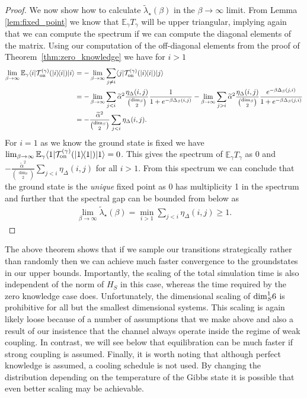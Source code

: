 \documentclass[
 amsmath,amssymb,
 aps,
onecolumn, 
nofootinbib]{revtex4-2}
\newcommand{\on}{\rm on}
\newcommand{\ket}[1]{|#1\rangle}
\newcommand{\bra}[1]{\langle #1|}
\newcommand{\ketbra}[2]{| #1\rangle\! \langle #2|}
\newcommand{\EE}{\mathbb{E}}
\newcommand{\TT}{\mathcal{T}}
\begin{document}
\begin{proof}
We now show how to calculate $\widetilde{\lambda}_\star(\beta)$ in the $\beta \to \infty$ limit. From Lemma \ref{lem:fixed_point} we know that $\EE_\gamma T_\gamma$ will be upper triangular, implying again that we can compute the spectrum if we can compute the diagonal elements of the matrix. Using our computation of the off-diagonal elements from the proof of Theorem~\ref{thm:zero_knowledge} we have for $i > 1$
\begin{align}
    \lim_{\beta \to \infty} \EE_\gamma \bra{i} \TT_{\on}^{(\gamma)}(\ketbra{i}{i}) \ket{i} &= - \lim_{\beta \to \infty} \sum_{j \neq i} \bra{j} \TT_{\on}^{(\gamma)}(\ketbra{i}{i}) \ket{j} \\
    &= - \lim_{\beta \to \infty} \sum_{j < i} \widetilde{\alpha}^2 \frac{\eta_\Delta(i,j)}{\binom{\dim_S}{2}} \frac{1}{1 + e^{-\beta \Delta_S(i,j)}} - \lim_{\beta \to \infty} \sum_{j > i} \widetilde{\alpha}^2 \frac{\eta_\Delta(i,j)}{\binom{\dim_S}{2}} \frac{e^{-\beta \Delta_S(j, i)}}{1 + e^{-\beta \Delta_S(j, i)}} \\
    &= - \frac{\widetilde{\alpha}^2}{\binom{\dim_S}{2}} \sum_{j < i} \eta_\Delta(i,j).
\end{align}
For $i = 1$ as we know the ground state is fixed we have $\lim_{\beta \to \infty} \EE_\gamma \bra{1} \TT_{\on}^{(\gamma)}(\ketbra{1}{1}) \ket{1} = 0$. This gives the spectrum of $\EE_\gamma T_\gamma$ as 0 and $- \frac{\widetilde{\alpha}^2}{\binom{\dim_S}{2}} \sum_{j < i} \eta_\Delta(i,j)$ for all $i > 1$. From this spectrum we can conclude that the ground state is the \emph{unique} fixed point as 0 has multiplicity 1 in the spectrum and further that the spectral gap can be bounded from below as
\begin{align}
    \lim_{\beta \to \infty} \widetilde{\lambda}_\star(\beta) = \min_{i > 1} \sum_{j < i} \eta_\Delta(i,j) \ge 1.
\end{align}
\end{proof}

The above theorem shows that if we sample our transitions strategically rather than randomly then we can achieve much faster convergence to the groundstates in our upper bounds.  Importantly, the scaling of the total simulation time is also independent of the norm of $H_S$ in this case, whereas the time required by the zero knowledge case does.  Unfortunately, the dimensional scaling of ${\rm dim}_S^16$ is prohibitive for all but the smallest dimensional systems.  This scaling is again likely loose because of a number of assumptions that we make above and also a result of our insistence that the channel always operate inside the regime of weak coupling.  In contrast, we will see below that equilibration can be much faster if strong coupling is assumed.  Finally, it is worth noting that although perfect knowledge is assumed, a cooling schedule is not used.  By changing the distribution depending on the temperature of the Gibbs state it is possible that even better scaling may be achievable.
\end{document}
